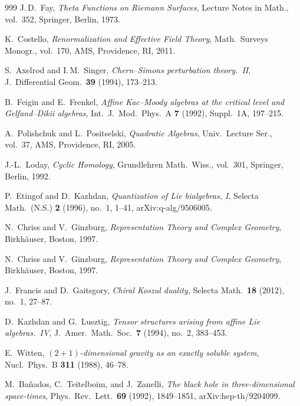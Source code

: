 \documentclass[11pt]{memoir}
\begin{document}
\begin{thebibliography}{999}
J.\,D.~Fay, \emph{Theta Functions on Riemann Surfaces}, Lecture Notes in Math., vol.~352, Springer, Berlin, 1973.

K.~Costello, \emph{Renormalization and Effective Field Theory}, Math.\ Surveys Monogr., vol.~170, AMS, Providence, RI, 2011.

S.~Axelrod and I.\,M.~Singer, \emph{Chern--Simons perturbation theory.~II}, J.~Differential Geom.\ \textbf{39} (1994), 173--213.

B.~Feigin and E.~Frenkel, \emph{Affine Kac--Moody algebras at the critical level and Gelfand--Dikii algebras}, Int.\ J.\ Mod.\ Phys.\ A \textbf{7} (1992), Suppl.~1A, 197--215.

A.~Polishchuk and L.~Positselski, \emph{Quadratic Algebras}, Univ.\ Lecture Ser., vol.~37, AMS, Providence, RI, 2005.

J.-L.~Loday, \emph{Cyclic Homology}, Grundlehren Math.\ Wiss., vol.~301, Springer, Berlin, 1992.

P.~Etingof and D.~Kazhdan, \emph{Quantization of Lie bialgebras, I}, Selecta Math.\ (N.S.) \textbf{2} (1996), no.~1, 1--41, arXiv:q-alg/9506005.

N.~Chriss and V.~Ginzburg, \emph{Representation Theory and Complex Geometry}, Birkh\"auser, Boston, 1997.

N.~Chriss and V.~Ginzburg, \emph{Representation Theory and Complex Geometry}, Birkh\"auser, Boston, 1997.

J.~Francis and D.~Gaitsgory, \emph{Chiral Koszul duality}, Selecta Math.\ \textbf{18} (2012), no.~1, 27--87.

D.~Kazhdan and G.~Lusztig, \emph{Tensor structures arising from affine Lie algebras.~IV}, J.~Amer.\ Math.\ Soc.\ \textbf{7} (1994), no.~2, 383--453.

E.~Witten, \emph{$(2+1)$-dimensional gravity as an exactly soluble system}, Nucl.\ Phys.\ B \textbf{311} (1988), 46--78.

M.~Ba\~nados, C.~Teitelboim, and J.~Zanelli, \emph{The black hole in three-dimensional space-times}, Phys.\ Rev.\ Lett.\ \textbf{69} (1992), 1849--1851, arXiv:hep-th/9204099.


\end{thebibliography}
\end{document}
